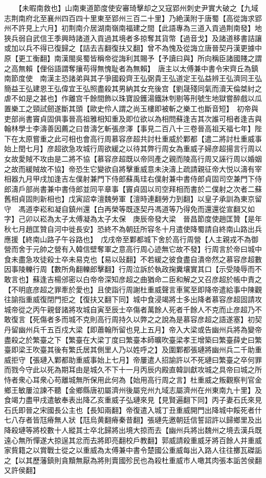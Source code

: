 　　【未暇南救也】山南東道節度使安審琦擊却之又寇郢州刺史尹實大破之【九域志荆南府北至襄州四百四十里東至郢州三百二十里】乃絶漢附于唐蜀【高從誨求郢州不許見上六月】初荆南介居湖南嶺南福建之間【此語專為三道入貢過荆南發】地狹兵弱自武信王季興時諸道入貢過其境者多掠奪其貨幣【過音戈】及諸道移書詰讓或加以兵不得已復歸之【詰去吉翻復扶又翻】曾不為愧及從誨立唐晉契丹漢更據中原【更工衡翻】南漢閩吳蜀皆稱帝從誨利其賜予【予讀曰與】所向稱臣諸國賤之謂之高無賴【俚俗語謂奪攘苟得無愧耻者為無賴】　唐主以太傅兼中書令宋齊丘為鎮南節度使　南漢主恐諸弟與其子爭國殺齊王弘弼貴王弘道定王弘益辨王弘濟同王弘簡益王弘建恩王弘偉宜王弘照盡殺其男納其女充後宫【劉晟殘同氣而瀆天倫桀紂之虐不如是之甚也】作離宫千餘間飾以珠寶設鑊湯鐵牀刳剔等刑號生地獄嘗醉戲以瓜置樂工之頸試劒遂斷其頭【歐史伶人謂之尚玉樓即被斬之樂工也斷音短】　初帝與吏部尚書竇貞固俱事晉高祖雅相知重及即位欲以為相問蘇逢吉其次誰可相者逢吉與翰林學士李濤善因薦之曰昔濤乞斬張彦澤【事見二百八十三卷晉高祖天福七年】陛下在太原嘗重之此可相也會高行周慕容彦超共討杜重威於鄴都【遣二將討杜重威事始上閏七月】彦超欲急攻城行周欲緩之以待其弊行周女為重威子婦彦超揚言行周以女故愛賊不攻由是二將不協【慕容彦超既以帝同產之親而陵高行周又誣行周以婚姻之故而緩賊故不協】帝恐生它變欲自將擊重威意未決濤上疏請親征帝大悦以濤有宰相器九月甲戌加逢吉左僕射兼門下侍郎蘇禹珪右僕射兼中書侍郎貞固司空兼門下侍郎濤戶部尚書兼中書侍郎並同平章事【竇貞固以司空拜相而書於二僕射之次者二蘇舊相貞固則新相也】戊寅詔幸澶魏勞軍【澶時連翻勞力到翻】以皇子承訓為東京留守　馮道李崧和凝自鎮州還【白再榮等既逐契丹馮道等乃得免而還還從宣翻又如字】己卯以崧為太子太傅凝為太子太保　庚辰帝發大梁　晉昌節度使趙匡贊【是年秋七月趙匡贊自河中徙長安】恐終不為朝廷所容冬十月遣使降蜀請自終南山路出兵應援【終南山路子午谷路也】　戊戌帝至鄴都城下舍於高行周營【人主親戎不為御營而舍于元帥之營有入韓信壁奪軍之意高行周心迹無它故不發】行周言於帝曰城中食未盡急攻徒殺士卒未易克也【易以䜴翻】不若緩之彼食盡自潰帝然之慕容彦超數因事陵轢行周【數所角翻轢郎擊翻】行周泣訴於執政掬糞壤實其口【示受陵辱而不敢言也】蘇逢吉楊邠密以白帝帝深知彦超之曲猶命二臣和解之又召彦超於帳中責之【不明底彦超之罪牽於愛也】且使詣行周謝杜重威聲言車駕至即降帝遣給事中陳觀往諭指重威復閉門拒之【復扶又翻下同】城中食浸竭將士多出降者慕容彦超固請攻城帝從之丙午親督諸將攻城自寅至辰士卒傷者萬餘人死者千餘人不克而止彦超乃不敢復言【死傷者多而城不克則高行周持久以弊之之說為是慕容彦超之語遂塞】初契丹留幽州兵千五百戍大梁【即蕭翰所留也見上五月】帝入大梁或告幽州兵將為變帝盡殺之於繁臺之下【繁臺在大梁丁度曰繁臺本師曠吹臺梁孝王增築曰繁臺薛史曰繁臺即梁王吹臺其後有繁氏居其側里人乃以姓呼之】及圍鄴都張璉將幽州兵二千助重威拒守【張璉入鄴都助重威事始上七月】帝屢遣人招諭許以不死璉曰繁臺之卒何罪而戮今守此以死為期耳由是城久不下十一月丙辰内殿直韓訓獻攻城之具帝曰城之所恃者衆心耳衆心苟離城無所保用此何為【始用高行周之言】杜重威之叛觀察判官金鄉王敏屢泣諫不聽【金鄉縣唐初屬濟州後屬兖州九域志屬濟州在州東南九十里】及食竭力盡甲戌遣敏奉表出降乙亥重威子弘璉來見【見賢遍翻下同】丙子妻石氏來見石氏即晉之宋國長公主也【長知兩翻】帝復遣入城丁丑重威開門出降城中餒死者什七八存者皆尫瘠無人狀【尫烏黄翻瘠秦昔翻】張璉先邀朝廷信誓詔許以歸鄉里及出降殺璉等將校數十人縱其士卒北歸將出境大掠而去【幽州兵將出魏州之境去漢兵既遠心無所憚遂大掠逞其忿而去將即亮翻校戶教翻】郭威請殺重威牙將百餘人并重威家貲籍之以賞戰士從之以重威為太傅兼中書令楚國公重威每出入路人往往擲瓦磔詬之【以其歷藩鎮則貪黷無厭為將則賣國殄民也為殺杜重威市人噉其肉張本詬苦侯翻又許侯翻】

